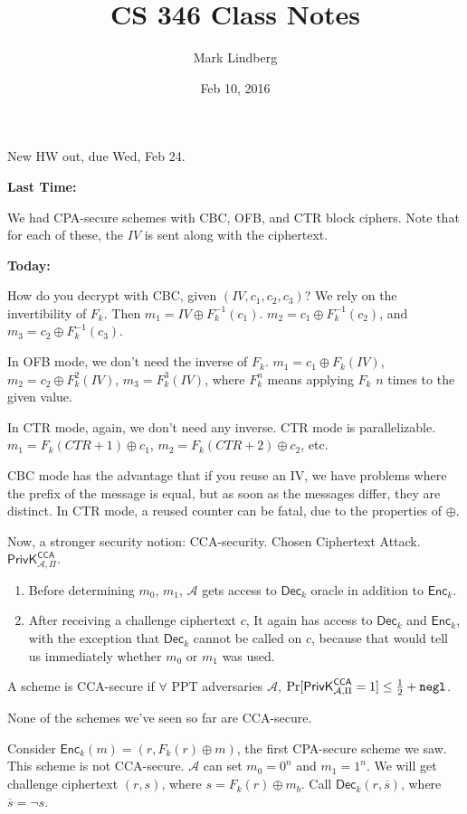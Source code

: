 \documentclass[12pt]{article}
\newcommand{\AAA}{\mathcal{A}}
\newcommand{\Enc}{\mathsf{Enc}}
\newcommand{\Dec}{\mathsf{Dec}}
\newcommand{\ExptCcaArgs}[2]{\mathsf{PrivK}^{\mathsf{CCA}}_{#1,#2}}
\newcommand{\ExptCca}{\ExptCcaArgs{\AAA}{\Pi}}
\newcommand{\xor}{\oplus}
\newcommand{\negl}{\tt negl}
\begin{document}
\title{CS 346 Class Notes}
\date{Feb 10, 2016}
\author{Mark Lindberg}
\maketitle
\thispagestyle{fancy}

New HW out, due Wed, Feb 24.

{\bf Last Time:}

We had CPA-secure schemes with CBC, OFB, and CTR block ciphers. Note that for each of these, the $IV$ is sent along with the ciphertext.

{\bf Today:}

How do you decrypt with CBC, given $(IV,c_1,c_2,c_3)$? We rely on the invertibility of $F_k$. Then $m_1=IV\xor F_k^{-1}(c_1)$. $m_2=c_1\xor F_k^{-1}(c_2)$, and $m_3=c_2\xor F_k^{-1}(c_3)$.

In OFB mode, we don't need the inverse of $F_k$. $m_1=c_1\xor F_k(IV)$, $m_2=c_2\xor F_k^2(IV)$, $m_3=F_k^3(IV)$, where $F_k^n$ means applying $F_k$ $n$ times to the given value.

In CTR mode, again, we don't need any inverse. CTR mode is parallelizable. $m_1=F_k(CTR+1)\xor c_1$, $m_2=F_k(CTR+2)\xor c_2$, etc.

CBC mode has the advantage that if you reuse an IV, we have problems where the prefix of the message is equal, but as soon as the messages differ, they are distinct. In CTR mode, a reused counter can be fatal, due to the properties of $\xor$.

Now, a stronger security notion: CCA-security. Chosen Ciphertext Attack. $\ExptCca$.\begin{enumerate}

\item Before determining $m_0$, $m_1$, $\AAA$ gets access to $\Dec_k$ oracle in addition to $\Enc_k$.

\item After receiving a challenge ciphertext $c$, It again has access to $\Dec_k$ and $\Enc_k$, with the exception that $\Dec_k$ cannot be called on $c$, because that would tell us immediately whether $m_0$ or $m_1$ was used.

\end{enumerate}

A scheme is CCA-secure if $\forall$ PPT adversaries $\AAA$, $\Pr[\ExptCca=1]\leq\frac{1}{2}+\negl$.

None of the schemes we've seen so far are CCA-secure.

Consider $\Enc_k(m)=(r,F_k(r)\xor m)$, the first CPA-secure scheme we saw. This scheme is not CCA-secure. $\AAA$ can set $m_0=0^n$ and $m_1=1^n$. We will get challenge ciphertext $(r,s)$, where $s=F_k(r)\xor m_b$. Call $\Dec_k(r,\overline{s})$, where $\overline{s}=\neg s$.
\end{document}
